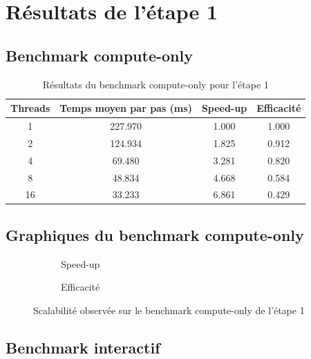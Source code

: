 \section{Résultats de l'étape 1}

\subsection{Benchmark compute-only}

\begin{table}[H]
    \centering
    \begin{tabular}{c c c c}
        \toprule
        \textbf{Threads} & \textbf{Temps moyen par pas (ms)} & \textbf{Speed-up} & \textbf{Efficacité} \\
        \midrule
        1 & 227.970 & 1.000 & 1.000 \\
        2 & 124.934 & 1.825 & 0.912 \\
        4 & 69.480 & 3.281 & 0.820 \\
        8 & 48.834 & 4.668 & 0.584 \\
        16 & 33.233 & 6.861 & 0.429 \\
        \bottomrule
    \end{tabular}
    \caption{Résultats du benchmark compute-only pour l'étape 1}
    \label{tab:stage1_results}
\end{table}

\subsection{Graphiques du benchmark compute-only}

\begin{figure}[H]
    \centering
    \begin{subfigure}[t]{0.48\linewidth}
        \centering
        
        \caption{Speed-up}
        \label{fig:stage1_speedup}
    \end{subfigure}
    \hfill
    \begin{subfigure}[t]{0.48\linewidth}
        \centering
        
        \caption{Efficacité}
        \label{fig:stage1_efficiency}
    \end{subfigure}
    \caption{Scalabilité observée sur le benchmark compute-only de l'étape 1}
    \label{fig:stage1_scaling}
\end{figure}

\subsection{Benchmark interactif}

